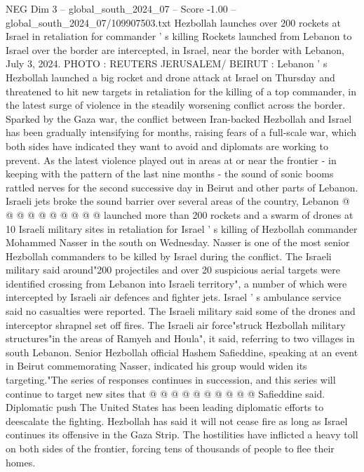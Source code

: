 \begin{textsample}{NEG Dim 3 – global\_south\_2024\_07 – Score -1.00 – global\_south\_2024\_07/109907503.txt}  \label{ex:f3_neg_144}
Hezbollah launches over 200 rockets at Israel in retaliation for commander ' s killing Rockets launched from Lebanon to Israel over the border are intercepted, in Israel, near the border with Lebanon, July 3, 2024.
PHOTO : REUTERS JERUSALEM/ BEIRUT : Lebanon ' s Hezbollah launched a big rocket and drone attack at Israel on Thursday and threatened to hit new targets in retaliation for the killing of a top commander, in the latest surge of violence in the steadily worsening conflict across the border.
Sparked by the Gaza war, the conflict between Iran-backed Hezbollah and Israel has been gradually intensifying for months, raising fears of a full-scale war, which both sides have indicated they want to avoid and diplomats are working to prevent.
As the latest violence played out in areas at or near the frontier - in keeping with the pattern of the last nine months - the sound of sonic booms rattled nerves for the second successive day in Beirut and other parts of Lebanon.
Israeli jets broke the sound barrier over several areas of the country, Lebanon @ @ @ @ @ @ @ @ @ @ launched more than 200 rockets and a swarm of drones at 10 Israeli military sites in retaliation for Israel ' s killing of Hezbollah commander Mohammed Nasser in the south on Wednesday.
Nasser is one of the most senior Hezbollah commanders to be killed by Israel during the conflict.
The Israeli military said around"200 projectiles and over 20 suspicious aerial targets were identified crossing from Lebanon into Israeli territory", a number of which were intercepted by Israeli air defences and fighter jets.
Israel ' s ambulance service said no casualties were reported.
The Israeli military said some of the drones and interceptor shrapnel set off fires.
The Israeli air force"struck Hezbollah military structures"in the areas of Ramyeh and Houla", it said, referring to two villages in south Lebanon.
Senior Hezbollah official Hashem Safieddine, speaking at an event in Beirut commemorating Nasser, indicated his group would widen its targeting."The series of responses continues in succession, and this series will continue to target new sites that @ @ @ @ @ @ @ @ @ @ Safieddine said.
Diplomatic push The United States has been leading diplomatic efforts to deescalate the fighting.
Hezbollah has said it will not cease fire as long as Israel continues its offensive in the Gaza Strip.
The hostilities have inflicted a heavy toll on both sides of the frontier, forcing tens of thousands of people to flee their homes.

\end{textsample}
